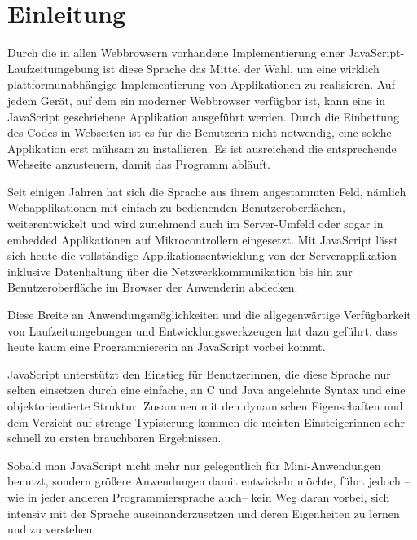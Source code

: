 
\section{Einleitung}

Durch die in allen Webbrowsern vorhandene Implementierung einer JavaScript-Lauf\-zeit\-um\-ge\-bung ist diese Sprache das Mittel der Wahl, um eine wirklich plattformunabhängige Implementierung von Applikationen zu realisieren. Auf jedem Gerät, auf dem ein moderner Webbrowser verfügbar ist, kann eine in JavaScript geschriebene Applikation ausgeführt werden. Durch die Einbettung des Codes in Webseiten ist es für die Benutzerin nicht notwendig, eine solche Applikation erst mühsam zu installieren. Es ist ausreichend die entsprechende Webseite anzusteuern, damit das Programm abläuft.

Seit einigen Jahren hat sich die Sprache aus ihrem angestammten Feld, nämlich Webapplikationen mit einfach zu bedienenden Benutzeroberflächen, weiterentwickelt und wird zunehmend auch im Server-Umfeld oder sogar in embedded Applikationen auf Mikrocontrollern eingesetzt. Mit JavaScript lässt sich heute die vollständige Applikationsentwicklung von der Serverapplikation inklusive Datenhaltung über die Netzwerkkommunikation bis hin zur Benutzeroberfläche im Browser der Anwenderin abdecken. 

Diese Breite an Anwendungsmöglichkeiten und die allgegenwärtige Verfügbarkeit von Laufzeitumgebungen und Entwicklungswerkzeugen hat dazu geführt, dass heute kaum eine Programmiererin an JavaScript vorbei kommt.

JavaScript unterstützt den Einstieg für Benutzerinnen, die diese Sprache nur selten einsetzen durch eine einfache, an C und Java angelehnte Syntax und eine objektorientierte Struktur. Zusammen mit den dynamischen Eigenschaften und dem Verzicht auf strenge Typisierung kommen die meisten Einsteigerinnen sehr schnell zu ersten brauchbaren Ergebnissen.

Sobald man JavaScript nicht mehr nur gelegentlich für Mini-Anwendungen benutzt, sondern größere Anwendungen damit entwickeln möchte, führt jedoch --wie in jeder anderen Programmiersprache auch-- kein Weg daran vorbei, sich intensiv mit der Sprache auseinanderzusetzen und deren Eigenheiten zu lernen und zu verstehen.

